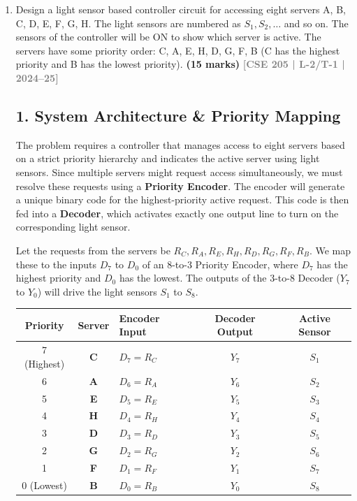 \documentclass[12pt,a3paper]{article}
\newcommand{\yr}[1]{\hfill\textcolor{gray}{\small\textbf{[#1]}}}
\newcommand{\mk}[1]{\textcolor{orange!70!black}{\small\textbf{(#1 marks)}}}
\begin{document}
\begin{enumerate}

\item Design a light sensor based controller circuit for accessing eight servers A, B, C, D, E, F, G, H. The light sensors are numbered as $S_1, S_2, \ldots$ and so on. The sensors of the controller will be ON to show which server is active. The servers have some priority order: C, A, E, H, D, G, F, B (C has the highest priority and B has the lowest priority).
\mk{15} \yr{CSE 205 | L-2/T-1 | 2024--25}

\begin{tcolorbox}[enhanced,breakable,ansbox,colback=cD!4,colframe=cD,boxrule=0.8pt,arc=5pt,title={\textbf{Answer}},fonttitle=\bfseries\color{white},colbacktitle=cD]

\subsection*{1. System Architecture \& Priority Mapping}

The problem requires a controller that manages access to eight servers based on a strict priority hierarchy and indicates the active server using light sensors. Since multiple servers might request access simultaneously, we must resolve these requests using a \textbf{Priority Encoder}. The encoder will generate a unique binary code for the highest-priority active request. This code is then fed into a \textbf{Decoder}, which activates exactly one output line to turn on the corresponding light sensor.

Let the requests from the servers be $R_C, R_A, R_E, R_H, R_D, R_G, R_F, R_B$. 
We map these to the inputs $D_7$ to $D_0$ of an 8-to-3 Priority Encoder, where $D_7$ has the highest priority and $D_0$ has the lowest. The outputs of the 3-to-8 Decoder ($Y_7$ to $Y_0$) will drive the light sensors $S_1$ to $S_8$.

\begin{center}
\renewcommand{\arraystretch}{1.2}
\begin{tabular}{cclcc}
\toprule
\textbf{Priority} & \textbf{Server} & \textbf{Encoder Input} & \textbf{Decoder Output} & \textbf{Active Sensor} \\
\midrule
7 (Highest) & \textbf{C} & $D_7 = R_C$ & $Y_7$ & $S_1$ \\
6 & \textbf{A} & $D_6 = R_A$ & $Y_6$ & $S_2$ \\
5 & \textbf{E} & $D_5 = R_E$ & $Y_5$ & $S_3$ \\
4 & \textbf{H} & $D_4 = R_H$ & $Y_4$ & $S_4$ \\
3 & \textbf{D} & $D_3 = R_D$ & $Y_3$ & $S_5$ \\
2 & \textbf{G} & $D_2 = R_G$ & $Y_2$ & $S_6$ \\
1 & \textbf{F} & $D_1 = R_F$ & $Y_1$ & $S_7$ \\
0 (Lowest)  & \textbf{B} & $D_0 = R_B$ & $Y_0$ & $S_8$ \\
\bottomrule
\end{tabular}
\end{center}


\end{tcolorbox}
\end{enumerate}
\end{document}
